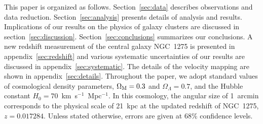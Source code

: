 This paper is organized as follows. Section~\ref{sec:data} describes observations and data reduction. Section~\ref{sec:analysis} presents details of analysis and results. Implications of our results on the physics of galaxy clusters are discussed in section~\ref{sec:discussion}. Section~\ref{sec:conclusions} summarizes our conclusions. A new redshift measurement of the central galaxy NGC~1275 is presented in appendix~\ref{sec:redshift} and various systematic uncertainties of our results are discussed in appendix~\ref{sec:systematic}. The details of the velocity mapping are shown in appendix~\ref{sec:details}. Throughout the paper, we adopt standard values of cosmological density parameters, $\Omega_{\rm M}=0.3$ and $\Omega_{\Lambda}=0.7$, and the Hubble constant $H_0 = 70$~km~s$^{-1}$~Mpc$^{-1}$. In this cosmology, the angular size of 1~arcmin corresponds to the physical scale of 21~kpc at the updated redshift of NGC~1275, $z=0.017284$. Unless stated otherwise, errors are given at 68\% confidence levels.
